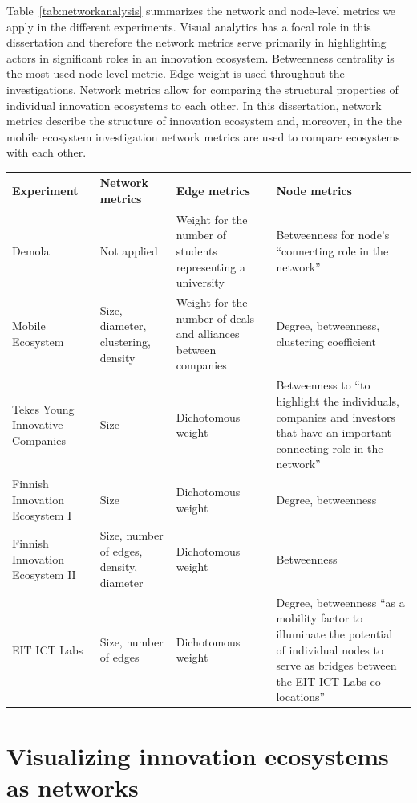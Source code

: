 Table~\ref{tab:networkanalysis} summarizes the network and node-level metrics we apply in the different experiments. Visual analytics has a focal role in this dissertation and therefore the network metrics serve primarily in highlighting actors in significant roles in an innovation ecosystem. Betweenness centrality is the most used node-level metric. Edge weight is used throughout the investigations. Network metrics allow for comparing the structural properties of individual innovation ecosystems to each other. In this dissertation, network metrics describe the structure of innovation ecosystem and, moreover, in the the mobile ecosystem investigation network metrics are used to compare ecosystems with each other.

\begingroup
{}\label{tab:networkanalysis}
\begin{tabular}{p{2.5cm} p{2.5cm} p{3cm} p{3.75cm}}
\toprule
Experiment & Network metrics & Edge metrics & Node metrics \\
\midrule
Demola &
Not applied &
Weight for the number of students representing a university & 
Betweenness for node's ``connecting role in the network'' \\

Mobile Ecosystem & 
Size, diameter, clustering, density &
Weight for the number of deals and alliances between companies &
Degree, betweenness, clustering coefficient \\

Tekes Young Innovative Companies &
Size &
Dichotomous weight &
Betweenness to ``to highlight the individuals, companies and investors that have an important connecting role in the network'' \\

Finnish Innovation Ecosystem I & 
Size & 
Dichotomous weight &
Degree, betweenness \\

Finnish Innovation Ecosystem II  &
Size, number of edges, density, diameter &
Dichotomous weight &
Betweenness \\

EIT ICT Labs &
Size, number of edges &
Dichotomous weight &
Degree, betweenness ``as a mobility factor to illuminate the potential of individual nodes to serve as bridges between the EIT ICT Labs co-locations'' \\
\bottomrule
\end{tabular}
\endgroup

\section{Visualizing innovation ecosystems as networks}

